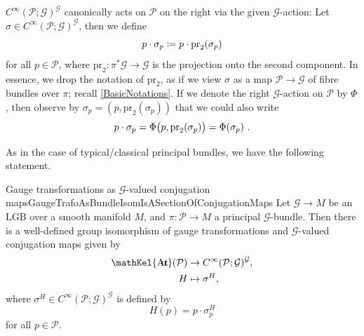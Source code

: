 \documentclass[reqno,a4paper,oneside]{amsart}
\theoremstyle{plain}
\theoremstyle{remark}
\theoremstyle{definition}
\DeclareMathOperator{\sAut}{\mathKel{A\mkern-5.5mu u\mkern-4mu t\mkern-1.5mu}}
\begin{document}
$C^\infty(\mathcal{P}; \mathcal{G})^{\mathcal{G}}$ canonically acts on $\mathcal{P}$ on the right via the given $\mathcal{G}$-action: Let $\sigma \in C^\infty(\mathcal{P}; \mathcal{G})^{\mathcal{G}}$, then we define
\begin{equation}\label{MultiWithPulli}
p \cdot \sigma_p
\coloneqq
p \cdot \mathrm{pr}_2\mleft( \sigma_p \mright)
\end{equation}
for all $p \in \mathcal{P}$, where $\mathrm{pr}_2\colon \pi^*\mathcal{G} \to \mathcal{G}$ is the projection onto the second component. In essence, we drop the notation of $\mathrm{pr}_2$, as if we view $\sigma$ as a map $\mathcal{P} \to \mathcal{G}$ of fibre bundles over $\pi$; recall \ref{BasicNotations}. If we denote the right $\mathcal{G}$-action on $\mathcal{P}$ by $\Phi$, then observe by $\sigma_p = (p, \mathrm{pr}_2(\sigma_p))$ that we could also write
\begin{equation*}
p \cdot \sigma_p
=
\Phi \bigl( p, \mathrm{pr}_2\mleft( \sigma_p \mright) \bigr)
=
\Phi\mleft( \sigma_p \mright)~.
\end{equation*}

As in the case of typical/classical principal bundles, we have the following statement.

\begin{propositions}{Gauge transformations as $\mathcal{G}$-valued conjugation maps}{GaugeTrafoAsBundleIsomIsASectionOfConjugationMaps}
Let $\mathcal{G} \to M$ be an LGB over a smooth manifold $M$, and $\pi\colon\mathcal{P} \to M$ a principal $\mathcal{G}$-bundle. Then there is a well-defined group isomorphism of gauge transformations and $\mathcal{G}$-valued conjugation maps given by
\begin{align*}
\sAut(\mathcal{P}) &\to C^\infty(\mathcal{P}; \mathcal{G})^{\mathcal{G}},\\
H &\mapsto \sigma^H,
\end{align*}
where $\sigma^H \in C^\infty(\mathcal{P}; \mathcal{G})^{\mathcal{G}}$ is defined by
\begin{equation*}
H(p) = p \cdot \sigma^H_p
\end{equation*}
for all $p \in \mathcal{P}$.
\end{propositions}
\end{document}
